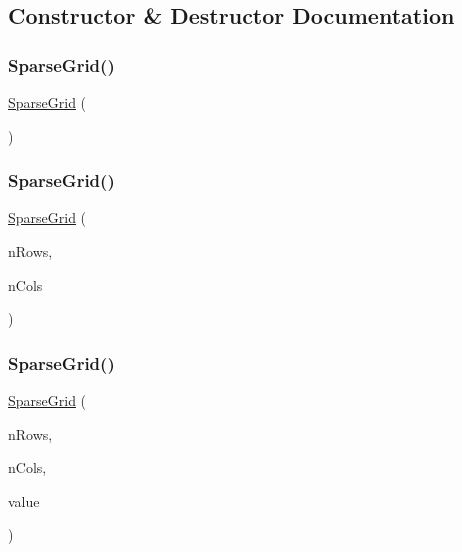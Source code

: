 \subsection{Constructor \& Destructor Documentation}
\mbox{\label{classSparseGrid_aa3e62bd1aaaaaa299dd7679cf577c1bd}} 
\subsubsection{\texorpdfstring{Sparse\+Grid()}{SparseGrid()}\hspace{0.1cm}{\footnotesize\ttfamily [1/5]}}
{\footnotesize\ttfamily \mbox{\hyperlink{classSparseGrid}{Sparse\+Grid}} (\begin{DoxyParamCaption}{ }\end{DoxyParamCaption})}

\mbox{\label{classSparseGrid_acc9a9175eb75e387baf77fb35611ef5f}} 
\subsubsection{\texorpdfstring{Sparse\+Grid()}{SparseGrid()}\hspace{0.1cm}{\footnotesize\ttfamily [2/5]}}
{\footnotesize\ttfamily \mbox{\hyperlink{classSparseGrid}{Sparse\+Grid}} (\begin{DoxyParamCaption}\item[{int}]{n\+Rows,  }\item[{int}]{n\+Cols }\end{DoxyParamCaption})}

\mbox{\label{classSparseGrid_aa3750390e26b86ba32a14380f09c2001}} 
\subsubsection{\texorpdfstring{Sparse\+Grid()}{SparseGrid()}\hspace{0.1cm}{\footnotesize\ttfamily [3/5]}}
{\footnotesize\ttfamily \mbox{\hyperlink{classSparseGrid}{Sparse\+Grid}} (\begin{DoxyParamCaption}\item[{int}]{n\+Rows,  }\item[{int}]{n\+Cols,  }\item[{const Value\+Type \&}]{value }\end{DoxyParamCaption})}

